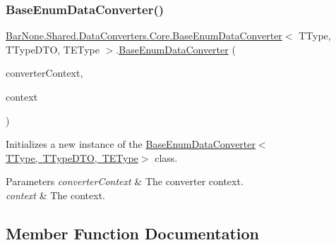 \subsubsection{\texorpdfstring{Base\+Enum\+Data\+Converter()}{BaseEnumDataConverter()}}
{\footnotesize\ttfamily \mbox{\hyperlink{class_bar_none_1_1_shared_1_1_data_converters_1_1_core_1_1_base_enum_data_converter}{Bar\+None.\+Shared.\+Data\+Converters.\+Core.\+Base\+Enum\+Data\+Converter}}$<$ T\+Type, T\+Type\+D\+TO, T\+E\+Type $>$.\mbox{\hyperlink{class_bar_none_1_1_shared_1_1_data_converters_1_1_core_1_1_base_enum_data_converter}{Base\+Enum\+Data\+Converter}} (\begin{DoxyParamCaption}\item[{\mbox{\hyperlink{class_bar_none_1_1_shared_1_1_data_converters_1_1_converters}{Converters}}}]{converter\+Context,  }\item[{\mbox{\hyperlink{interface_bar_none_1_1_shared_1_1_core_1_1_i_domain_context}{I\+Domain\+Context}}}]{context }\end{DoxyParamCaption})}



Initializes a new instance of the \mbox{\hyperlink{class_bar_none_1_1_shared_1_1_data_converters_1_1_core_1_1_base_enum_data_converter_a3696f6d6da7417940d0ab76b4e64f990}{Base\+Enum\+Data\+Converter$<$\+T\+Type, T\+Type\+D\+T\+O, T\+E\+Type$>$}} class. 


\begin{DoxyParams}{Parameters}
{\em converter\+Context} & The converter context.\\
\hline
{\em context} & The context.\\
\hline
\end{DoxyParams}


\subsection{Member Function Documentation}
\mbox{\label{class_bar_none_1_1_shared_1_1_data_converters_1_1_core_1_1_base_enum_data_converter_a9915e8d46fd529a7ea43d78d56e024a7}} 
